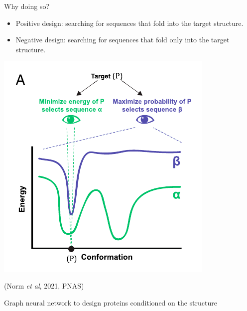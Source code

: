 \documentclass[presentation,smaller]{beamer}
\begin{document}
\begin{frame}[label={sec:org5ffaf26}]{Why doing so?}
\begin{itemize}
\item Positive design: searching for sequences that fold into the target structure.
\item Negative design: searching for sequences that fold \alert{only} into the target structure.
\end{itemize}

\begin{center}
\includegraphics[scale=0.7]{./img/af_landscape_optimization.png}
\end{center}

(Norm \emph{et al}, 2021, PNAS)
\end{frame}
\begin{frame}[label={sec:org48027d0}]{Graph neural network to design proteins conditioned on the structure}
\end{frame}
\end{document}
